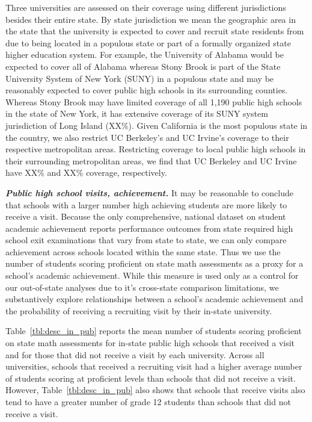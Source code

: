 \documentclass[twoside]{article}
\begin{document}
Three universities are assessed on their coverage using different jurisdictions besides their entire state. By state jurisdiction we mean the geographic area in the state that the university is expected to cover and recruit state residents from due to being located in a populous state or part of a formally organized state higher education system. For example, the University of Alabama would be expected to cover all of Alabama whereas Stony Brook is part of the State University System of New York (SUNY) in a populous state and may be reasonably expected to cover public high schools in its surrounding counties. Whereas Stony Brook may have limited coverage of all 1,190 public high schools in the state of New York, it has extensive coverage of its SUNY system jurisdiction of Long Island (XX\%). Given California is the most populous state in the country, we also restrict UC Berkeley's and UC Irvine's coverage to their respective metropolitan areas. Restricting coverage to local public high schools in their surrounding metropolitan areas, we find that UC Berkeley and UC Irvine have XX\% and XX\% coverage, respectively.



\textbf{\textit{Public high school visits, achievement.}} It may be reasonable to conclude that schools with a larger number high achieving students are more likely to receive a visit. Because the only comprehensive, national dataset on student academic achievement reports performance outcomes from state required high school exit examinations that vary from state to state, we can only compare achievement across schools located within the same state. Thus we use the number of students scoring proficient on state math assessments as a proxy for a school's academic achievement. While this measure is used only as a control for our out-of-state analyses due to it's cross-state comparison limitations, we substantively explore relationships between a school's academic achievement and the probability of receiving a recruiting visit by their in-state university.

Table~\ref{tbl:desc_in_pub} reports the mean number of students scoring proficient on state math assessments for in-state public high schools that received a visit and for those that did not receive a visit by each university. Across all universities, schools that received a recruiting visit had a higher average number of students scoring at proficient levels than schools that did not receive a visit. However, Table~\ref{tbl:desc_in_pub} also shows that schools that receive visits also tend to have a greater number of grade 12 students than schools that did not receive a visit.
\end{document}
